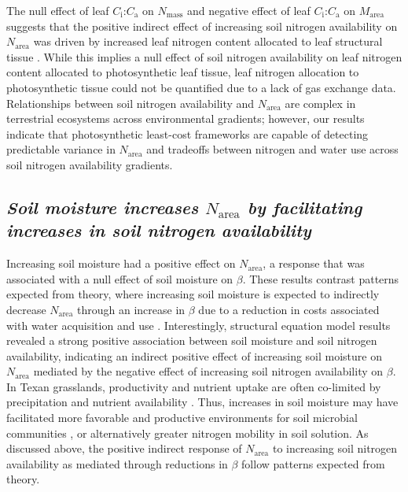 The null effect of leaf $C_\mathrm{i}$:$C_\mathrm{a}$ on $N_\mathrm{mass}$ and negative effect of leaf $C_\mathrm{i}$:$C_\mathrm{a}$ on $M_\mathrm{area}$ suggests that the positive indirect effect of increasing soil nitrogen availability on $N_\mathrm{area}$ was driven by increased leaf nitrogen content allocated to leaf structural tissue . While this implies a null effect of soil nitrogen availability on leaf nitrogen content allocated to photosynthetic leaf tissue, leaf nitrogen allocation to photosynthetic tissue could not be quantified due to a lack of gas exchange data. Relationships between soil nitrogen availability and $N_\mathrm{area}$ are complex in terrestrial ecosystems across environmental gradients; however, our results indicate that photosynthetic least-cost frameworks are capable of detecting predictable variance in $N_\mathrm{area}$ and tradeoffs between nitrogen and water use across soil nitrogen availability gradients.

\begin{singlespace}
\subsection{\textit{Soil moisture increases $N_\mathrm{area}$ by facilitating increases in soil nitrogen availability}}
\end{singlespace}
\noindent Increasing soil moisture had a positive effect on $N_\mathrm{area}$, a response that was associated with a null effect of soil moisture on $\beta$. These results contrast patterns expected from theory, where increasing soil moisture is expected to indirectly decrease $N_\mathrm{area}$ through an increase in $\beta$ due to a reduction in costs associated with water acquisition and use . Interestingly, structural equation model results revealed a strong positive association between soil moisture and soil nitrogen availability, indicating an indirect positive effect of increasing soil moisture on $N_\mathrm{area}$ mediated by the negative effect of increasing soil nitrogen availability on $\beta$. In Texan grasslands, productivity and nutrient uptake are often co-limited by precipitation and nutrient availability . Thus, increases in soil moisture may have facilitated more favorable and productive environments for soil microbial communities , or alternatively greater nitrogen mobility in soil solution. As discussed above, the positive indirect response of $N_\mathrm{area}$ to increasing soil nitrogen availability as mediated through reductions in $\beta$ follow patterns expected from theory.

